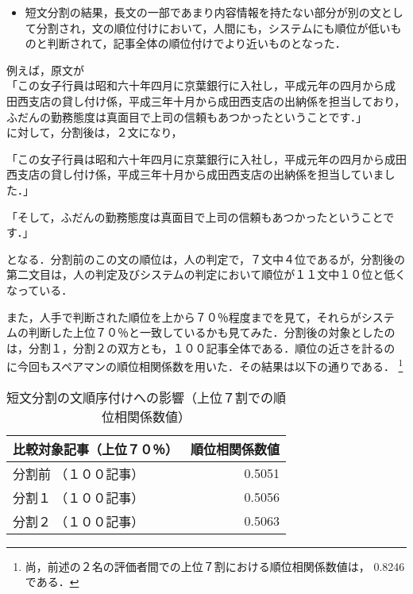 \begin{itemize}
\item 短文分割の結果，長文の一部であまり内容情報を持たない部分が別の文として分割され，文の順位付けにおいて，人間にも，システムにも順位が低いものと判断されて，記事全体の順位付けでより近いものとなった．
\end{itemize}

例えば，原文が\\
「この女子行員は昭和六十年四月に京葉銀行に入社し，平成元年の四月から成
田西支店の貸し付け係，平成三年十月から成田西支店の出納係を担当しており，
ふだんの勤務態度は真面目で上司の信頼もあつかったということです．」\\
に対して，分割後は，２文になり，

\begin{list}{}{}
\item[1.] 「この女子行員は昭和六十年四月に京葉銀行に入社し，平成元年の四月から成田西支店の貸し付け係，平成三年十月から成田西支店の出納係を担当していました．」

\item[2.] 「そして，ふだんの勤務態度は真面目で上司の信頼もあつかったということです．」
\end{list}
\noindent
となる．分割前のこの文の順位は，人の判定で，７文中４位であるが，分割後の第二文目は，人の判定及びシステムの判定において順位が１１文中１０位と低くなっている．

また，人手で判断された順位を上から７０％程度までを見て，それらがシステ
ムの判断した上位７０％と一致しているかも見てみた．分割後の対象としたの
は，分割１，分割２の双方とも，１００記事全体である．順位の近さを計るの
に今回もスペアマンの順位相関係数を用いた．その結果は以下の通りである．
\footnote{尚，前述の２名の評価者間での上位７割における順位相関係数値は，
0.8246である．}

\begin{table}[h]
\begin{center}
\begin{tabular}{|l|r|} \hline
比較対象記事（上位７０％） & 順位相関係数値\\ \hline
分割前 （１００記事） & 0.5051\\ \hline
分割１ （１００記事） & 0.5056\\ \hline
分割２ （１００記事） & 0.5063\\ \hline
\end{tabular}
\end{center}
\caption{短文分割の文順序付けへの影響（上位７割での順位相関係数値）}
\end{table}

